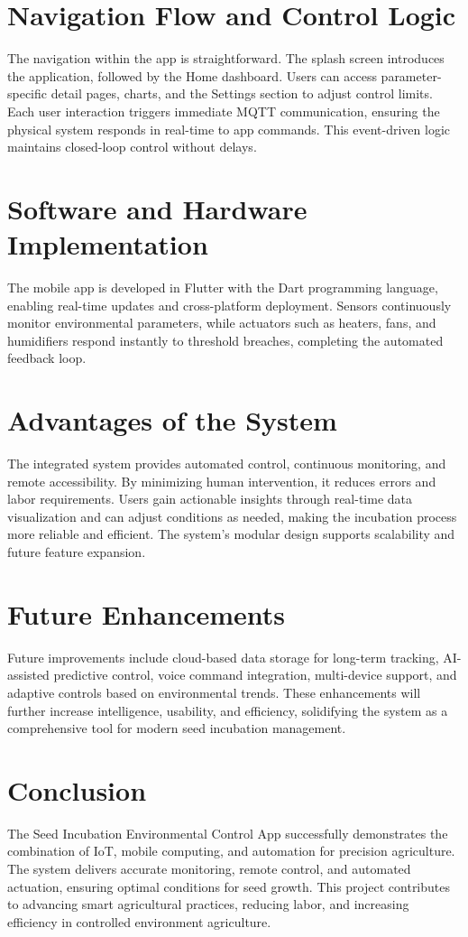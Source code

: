 \documentclass[../main]{subfiles}
\begin{document}
\section{Navigation Flow and Control Logic}

The navigation within the app is straightforward. The splash screen introduces
the application, followed by the Home dashboard. Users can access
parameter-specific detail pages, charts, and the Settings section to adjust
control limits. Each user interaction triggers immediate MQTT communication,
ensuring the physical system responds in real-time to app commands. This
event-driven logic maintains closed-loop control without delays.

\section{Software and Hardware Implementation}

The mobile app is developed in Flutter with the Dart programming language,
enabling real-time updates and cross-platform deployment. Sensors continuously
monitor environmental parameters, while actuators such as heaters, fans, and
humidifiers respond instantly to threshold breaches, completing the automated
feedback loop.

\section{Advantages of the System}

The integrated system provides automated control, continuous monitoring, and
remote accessibility. By minimizing human intervention, it reduces errors and
labor requirements. Users gain actionable insights through real-time data
visualization and can adjust conditions as needed, making the incubation
process more reliable and efficient. The system’s modular design supports
scalability and future feature expansion.

\section{Future Enhancements}

Future improvements include cloud-based data storage for long-term tracking,
AI-assisted predictive control, voice command integration, multi-device
support, and adaptive controls based on environmental trends. These
enhancements will further increase intelligence, usability, and efficiency,
solidifying the system as a comprehensive tool for modern seed incubation
management.

\section{Conclusion}

The Seed Incubation Environmental Control App successfully demonstrates the
combination of IoT, mobile computing, and automation for precision agriculture.
The system delivers accurate monitoring, remote control, and automated
actuation, ensuring optimal conditions for seed growth. This project
contributes to advancing smart agricultural practices, reducing labor, and
increasing efficiency in controlled environment agriculture.
\end{document}
